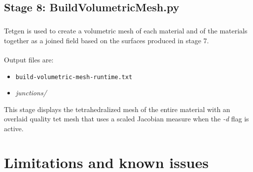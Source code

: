 \documentclass[fleqn,12pt,openany]{book}
\begin{document}
\section{Stage 8: BuildVolumetricMesh.py}

\paragraph{}
Tetgen is used to create a volumetric mesh of each material and of the materials 
together as a joined field based on the surfaces produced in stage 7. \\ \\

Output files are:
\begin{itemize}

\item{\verb+build-volumetric-mesh-runtime.txt+}
\item{\emph{junctions/}}

\end{itemize}

This stage displays the tetrahedralized mesh of the entire material with an 
overlaid quality tet mesh that uses a scaled Jacobian measure when the 
\emph{-d} flag is active.


\chapter{Limitations and known issues}
\label{chapter:limitations}
\end{document}
